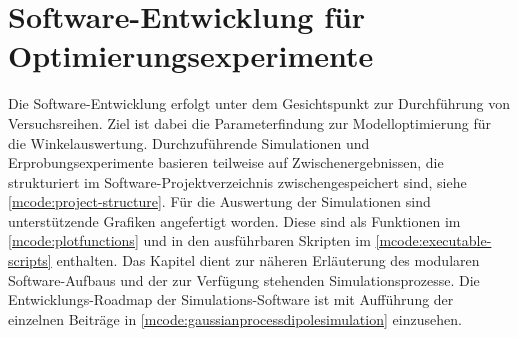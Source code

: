 %

\chapter{Software-Entwicklung für Optimierungsexperimente}\label{ch:sw-entwicklung-f-opt-exp}


Die Software-Entwicklung erfolgt unter dem Gesichtspunkt zur Durchführung von Versuchsreihen. Ziel ist dabei die Parameterfindung zur Modelloptimierung für die Winkelauswertung. Durchzuführende Simulationen und  Erprobungsexperimente basieren teilweise auf Zwischenergebnissen, die strukturiert im Software-Projektverzeichnis zwischengespeichert sind, siehe \autoref{mcode:project-structure}. Für die Auswertung der Simulationen sind unterstützende Grafiken angefertigt worden. Diese sind als Funktionen im \autoref{mcode:plotfunctions} und in den ausführbaren Skripten im \autoref{mcode:executable-scripts} enthalten. Das Kapitel dient zur näheren Erläuterung des modularen Software-Aufbaus und der zur Verfügung stehenden Simulationsprozesse. Die Entwicklungs-Roadmap der Simulations-Software ist mit Aufführung der einzelnen Beiträge in \autoref{mcode:gaussianprocessdipolesimulation} einzusehen.



